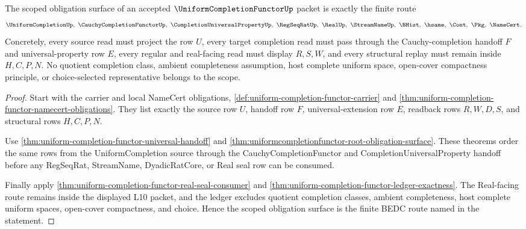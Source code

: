 \begin{theorem}
\label{thm:uniform-completion-functor-scoped-l10-obligation-route}
The scoped obligation surface of an accepted $\UniformCompletionFunctorUp$ packet is exactly the finite route
$$
\UniformCompletionUp,\ \CauchyCompletionFunctorUp,\ \CompletionUniversalPropertyUp,\ \RegSeqRatUp,\ \RealUp,\ \StreamNameUp,\ \BHist,\ \hsame,\ \Cont,\ \Pkg,\ \NameCert .
$$
Concretely, every source read must project the row $U$, every target completion read must pass through the Cauchy-completion handoff $F$ and universal-property row $E$, every regular and real-facing read must display $R,S,W$, and every structural replay must remain inside $H,C,P,N$. No quotient completion class, ambient completeness assumption, host complete uniform space, open-cover compactness principle, or choice-selected representative belongs to the scope.
\end{theorem}
\begin{proof}
Start with the carrier and local NameCert obligations, \autoref{def:uniform-completion-functor-carrier} and \autoref{thm:uniform-completion-functor-namecert-obligations}. They list exactly the source row $U$, handoff row $F$, universal-extension row $E$, readback rows $R,W,D,S$, and structural rows $H,C,P,N$.

Use \autoref{thm:uniform-completion-functor-universal-handoff} and \autoref{thm:uniformcompletionfunctor-root-obligation-surface}. These theorems order the same rows from the UniformCompletion source through the CauchyCompletionFunctor and CompletionUniversalProperty handoff before any RegSeqRat, StreamName, DyadicRatCore, or Real seal row can be consumed.

Finally apply \autoref{thm:uniform-completion-functor-real-seal-consumer} and \autoref{thm:uniform-completion-functor-ledger-exactness}. The Real-facing route remains inside the displayed L10 packet, and the ledger excludes quotient completion classes, ambient completeness, host complete uniform spaces, open-cover compactness, and choice. Hence the scoped obligation surface is the finite BEDC route named in the statement.
\end{proof}

